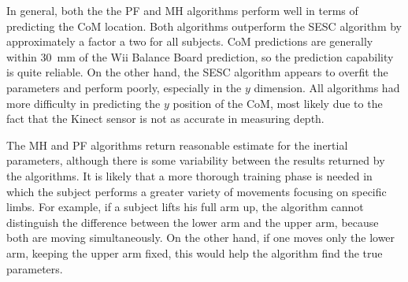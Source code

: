 %
%
%

In general, both the the PF and MH algorithms perform well in terms of predicting the CoM location. Both algorithms outperform the SESC algorithm by approximately a factor a two for all subjects. CoM predictions are generally within 30~mm of the Wii Balance Board prediction, so the prediction capability is quite reliable. On the other hand, the SESC algorithm appears to overfit the parameters and perform poorly, especially in the $y$ dimension. All algorithms had more difficulty in predicting the $y$ position of the CoM, most likely due to the fact that the Kinect sensor is not as accurate in measuring depth. 

The MH and PF algorithms return reasonable estimate for the inertial parameters, although there is some variability between the results returned by the algorithms. It is likely that a more thorough training phase is needed in which the subject performs a greater variety of movements focusing on specific limbs. For example, if a subject lifts his full arm up, the algorithm cannot distinguish the difference between the lower arm and the upper arm, because both are moving simultaneously. On the other hand, if one moves only the lower arm, keeping the upper arm fixed, this would help the algorithm find the true parameters. 

